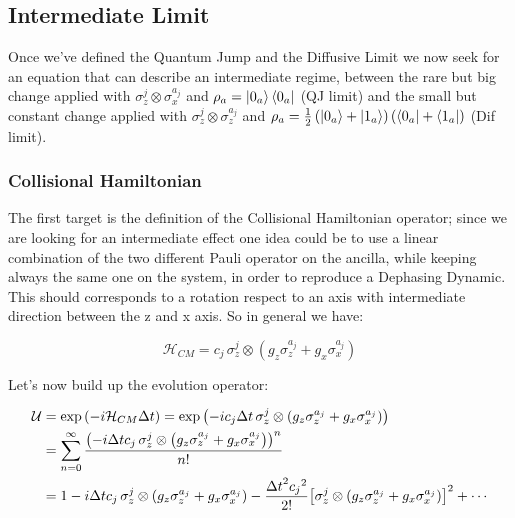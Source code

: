 \documentclass[a4paper,12pt]{article}
\begin{document}
	\clearpage
	\newpage
	
	\subsection{Intermediate Limit}
	Once we've defined the Quantum Jump and the Diffusive Limit we now seek for an equation that can describe an intermediate regime, between the rare but big change applied with $ \sigma_{z}^{j} \otimes \sigma_{x}^{a_j} $ and $ \rho_a = \ket{0_a}\bra{0_a} $ (QJ limit) and the small but constant change applied with $ \sigma_{z}^{j} \otimes \sigma_{z}^{a_j}$ and $ \rho_a = \frac{1}{2} \left(\ket{0_a} + \ket{1_a}\right)\left(\bra{0_a} + \bra{1_a} \right) $ (Dif limit).
	
	\subsubsection{Collisional Hamiltonian}
	The first target is the definition of the Collisional Hamiltonian operator; since we are looking for an intermediate effect one idea could be to use a linear combination of the two different Pauli operator on the ancilla, while keeping always the same one on the system, in order to reproduce a Dephasing Dynamic. This should corresponds to a rotation respect to an axis with intermediate direction between the z and x axis. So in general we have:
	
	\begin{equation}
		\mathcal{H}_{CM} = c_{j} \, \sigma_{z}^{j} \otimes \left(g_{z} \sigma_{z}^{a_j} + g_{x} \sigma_{x}^{a_j} \right) 
	\end{equation} 
	
	Let's now build up the evolution operator: 
	
	\begin{align}
		\mathcal{U} &= \exp{\left( -i \mathcal{H}_{CM} \Delta t \right)} = \exp{\left( -i c_{j} \Delta t \, \sigma_{z}^{j} \otimes \left(g_{z} \sigma_{z}^{a_j} + g_{x} \sigma_{x}^{a_j} \right) \right)} \\
		&= \sum_{n=0}^{\infty}{\frac{\left(-i \Delta t c_{j} \, \sigma_{z}^{j} \otimes \left(g_{z} \sigma_{z}^{a_j} + g_{x} \sigma_{x}^{a_j} \right) \right)^n}{n!}} \\
		&= 1 - i \Delta t c_{j} \, \sigma_{z}^{j} \otimes \left(g_{z} \sigma_{z}^{a_j} + g_{x} \sigma_{x}^{a_j} \right) - \frac{{\Delta t}^{2} {c_j}^{2}}{2!} {\left[\sigma_{z}^{j} \otimes \left(g_{z} \sigma_{z}^{a_j} + g_{x} \sigma_{x}^{a_j} \right)\right]}^{2} + \cdots \notag
	\end{align}
	
\end{document}

